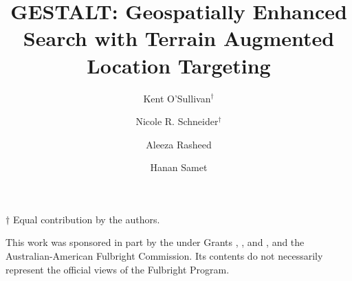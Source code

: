 \documentclass[sigconf]{style/acmart}
\begin{document}
\graphicspath{ {figures/}{auto_commit_fig/}{auto_fig/} }

\newcommand{\latexfile}[1]{}

\newcommand\blankpage{    \null
    \thispagestyle{empty}    \addtocounter{page}{-1}    \newpage}



\title{GESTALT: Geospatially Enhanced Search with Terrain Augmented Location Targeting}
\author{Kent O'Sullivan{$^\dagger$}}

\author{Nicole R. Schneider$^\dagger$}

\author{Aleeza Rasheed}

\author{Hanan Samet}



\begin{abstract}
\latexfile{00_Abstract.tex}
\end{abstract}

\maketitle
$\dagger$ Equal contribution by the authors.



\latexfile{10_Introduction.tex}
\latexfile{20_Architecture.tex}
\latexfile{30_Data_Acquisition.tex}
\latexfile{40_Ownership_Assignment.tex}
\latexfile{50_Search.tex}
\latexfile{70_Related.tex}
\latexfile{80_Conclusion.tex}

\begin{acks}
This work was sponsored in part by the  under Grants , , and , and the Australian-American Fulbright Commission. Its contents do not necessarily represent the official views of the Fulbright Program.
\end{acks}



 \label{bibliography}
\end{document}
